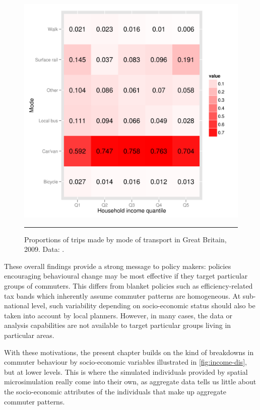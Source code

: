 \begin{figure}[htbp]
  \centerline{
    \includegraphics[width = 14 cm]{./Figures/income-heatmap}}
    \rule{35em}{0.5pt}
  \caption[Heatmap of mode of travel by income group]{Proportions
of trips made by mode of transport in Great Britain, 2009.
Data: \citep[Table 6]{DfT2011-commuting}.}
  \label{income-heatmap}
\end{figure}

These overall findings provide a strong message to policy makers:
policies encouraging behavioural change may be most effective
if they target particular groups of commuters.
This differs from blanket policies such as efficiency-related
tax bands which inherently assume commuter patterns are homogeneous.
At sub-national level, such variability depending on socio-economic
status should also be taken into account by local planners.
However, in many cases, the data or analysis capabilities are
not available to target particular groups living in particular areas.

With these motivations, the present chapter builds on the kind of breakdowns in
commuter behaviour
by socio-economic variables illustrated in \cref{fig:income-dis}, but
at lower levels. This is where the simulated individuals provided by
spatial microsimulation really come into their own, as aggregate data tells
us little about the socio-economic attributes of the individuals
that make up aggregate commuter patterns.


